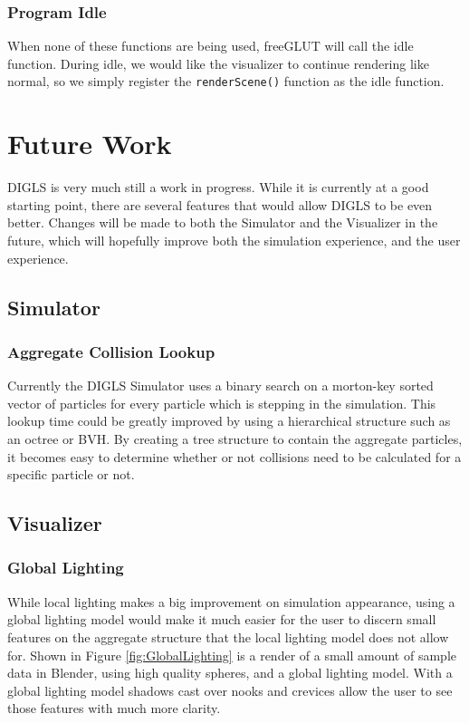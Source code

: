 \documentclass[fleqn,10pt]{UserGuideArx} %
\begin{document}
\subsubsection{Program Idle}
    When none of these functions are being used, freeGLUT will call the idle function. During idle, we would like the visualizer to continue rendering like normal, so we simply register the \texttt{renderScene()} function as the idle function.\\

\section{Future Work}
DIGLS is very much still a work in progress. While it is currently at a good starting point, there are several features that would allow DIGLS to be even better. Changes will be made to both the Simulator and the Visualizer in the future, which will hopefully improve both the simulation experience, and the user experience.
\subsection{Simulator}
\subsubsection{Aggregate Collision Lookup}
Currently the DIGLS Simulator uses a binary search on a morton-key sorted vector of particles for every particle which is stepping in the simulation. This lookup time could be greatly improved by using a hierarchical structure such as an octree or BVH. By creating a tree structure to contain the aggregate particles, it becomes easy to determine whether or not collisions need to be calculated for a specific particle or not.

\subsection{Visualizer}
\subsubsection{Global Lighting}
While local lighting makes a big improvement on simulation appearance, using a global lighting model would make it much easier for the user to discern small features on the aggregate structure that the local lighting model does not allow for. Shown in Figure \ref{fig:GlobalLighting} is a render of a small amount of sample data in Blender, using high quality spheres, and a global lighting model. With a global lighting model shadows cast over nooks and crevices allow the user to see those features with much more clarity.
\end{document}
